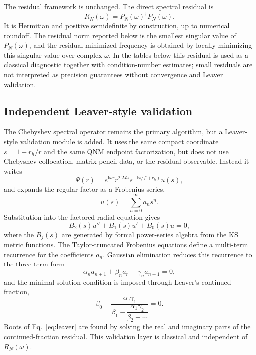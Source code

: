 \documentclass[10pt,letterpaper,twocolumn]{article}
\newcommand{\ii}{\mathrm{i}}
\begin{document}
The residual framework is unchanged. The direct spectral residual is
\begin{equation}
R_N(\omega)=P_N(\omega)^\dagger P_N(\omega).
\label{eq:directresidual}
\end{equation}
It is Hermitian and positive semidefinite by construction, up to numerical roundoff. The residual norm reported below is the smallest singular value of \(P_N(\omega)\), and the residual-minimized frequency is obtained by locally minimizing this singular value over complex \(\omega\). In the tables below this residual is used as a classical diagnostic together with condition-number estimates; small residuals are not interpreted as precision guarantees without convergence and Leaver validation.

\subsection{Independent Leaver-style validation}

The Chebyshev spectral operator remains the primary algorithm, but a Leaver-style validation module is added. It uses the same compact coordinate \(s=1-r_h/r\) and the same QNM endpoint factorization, but does not use Chebyshev collocation, matrix-pencil data, or the residual observable. Instead it writes
\begin{equation}
\Psi(r)=e^{\ii\omega r}r^{2\ii M\omega}s^{-\ii\omega/f'(r_h)}u(s),
\end{equation}
and expands the regular factor as a Frobenius series,
\begin{equation}
u(s)=\sum_{n=0}^{\infty} a_n s^n.
\end{equation}
Substitution into the factored radial equation gives
\begin{equation}
B_2(s)u''+B_1(s)u'+B_0(s)u=0,
\end{equation}
where the \(B_j(s)\) are generated by formal power-series algebra from the KS metric functions. The Taylor-truncated Frobenius equations define a multi-term recurrence for the coefficients \(a_n\). Gaussian elimination reduces this recurrence to the three-term form
\begin{equation}
\alpha_n a_{n+1}+\beta_n a_n+\gamma_n a_{n-1}=0,
\end{equation}
and the minimal-solution condition is imposed through Leaver's continued fraction,
\begin{equation}
\beta_0-\frac{\alpha_0\gamma_1}{\beta_1-\dfrac{\alpha_1\gamma_2}{\beta_2-\cdots}}=0.
\label{eq:leaver}
\end{equation}
Roots of Eq.~\eqref{eq:leaver} are found by solving the real and imaginary parts of the continued-fraction residual. This validation layer is classical and independent of \(R_N(\omega)\).
\end{document}
